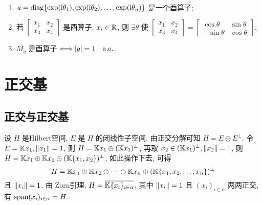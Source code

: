     \begin{Example}~
        \begin{enumerate}[(1)]
            \item $ u=\mathrm{diag}\{ \exp(\mathrm{i} \theta_{1}), \exp(\mathrm{i}\theta_{2}), \dots, \exp(\mathrm{i}\theta_{n}) \} $ 是一个酉算子;
            \item 若
        $ \left[\begin{smallmatrix}
        x_{1} & x_{2}\\
        x_{3} & x_{4}    
        \end{smallmatrix}\right] $ 是酉算子, $ x_{i}\in\mathbb{R} $, 则 $ \exists\theta $ 使 
        $ \left[\begin{smallmatrix}
            x_{1} & x_{2}\\
            x_{3} & x_{4}
        \end{smallmatrix}\right]=\left[\begin{smallmatrix}
            \cos\theta & \sin\theta \\
            -\sin\theta & \cos\theta
        \end{smallmatrix}\right] $;
        \item $ M_{g} $ 是酉算子 $ \Longleftrightarrow\left| g \right| =1\quad \mathrm{a.e.} $.
        \end{enumerate}
    \end{Example}

\section{正交基}
    \subsection{正交与正交基}
    设 $ H $ 是Hilbert空间, $ E $ 是 $ H $ 的闭线性子空间, 由正交分解可知 $ H=E\oplus E^{\bot} $. 令 $ E=\mathbb{K} x_{1}, \left\| x_{1} \right\|=1 $, 则 $ H=\mathbb{K} x_{1}\oplus (\mathbb{K} x_{1})^{\bot} $, 再取 $ x_{2}\in (\mathbb{K} x_{1})^{\bot}, \left\| x_{2} \right\|=1 $, 则 $ H=\mathbb{K} x_{1}\oplus \mathbb{K} x_{2}\oplus (\mathbb{K}\{ x_{1}, x_{2} \})^{\bot} $, 如此操作下去, 可得
    \[
        H=\mathbb{K} x_{1}\oplus \mathbb{K} x_{2}\oplus\cdots\oplus\mathbb{K} x_{n}\oplus(\mathbb{K} \{ x_{1}, x_{2}, \dots, x_{n} \})^{\bot}
    \]
    且 $ \left\| x_{i} \right\|=1 $. 由 Zorn引理, $ H=\overline{\mathbb{K}\{ x_{i} \}_{i\in\alpha}} $, 其中 $ \left\| x_{i} \right\|=1 $ 且 $ (x_{i})_{i\in\alpha} $ 两两正交, 有 $ \operatorname{span}(x_{i})_{i\in\alpha}=H $. 
    
